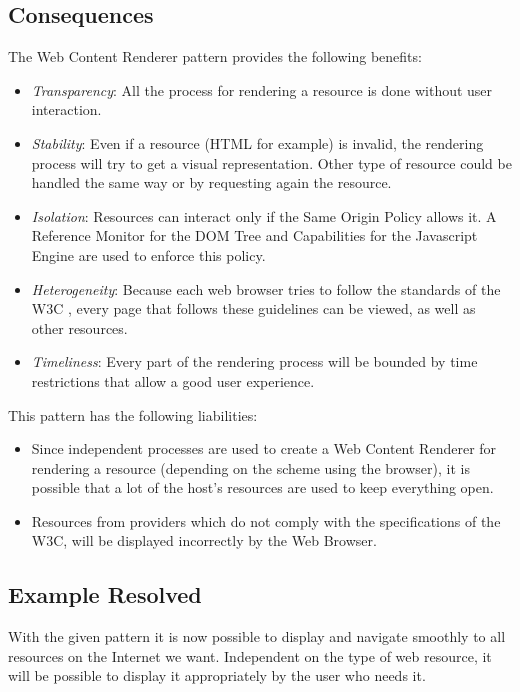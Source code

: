 \documentclass{sig-alternate-05-2015}
\begin{document}
  \subsection*{Consequences}
  The Web Content Renderer pattern provides the following benefits:
  \begin{itemize}
    \item \textit{Transparency}: All the process for rendering a resource is done without user interaction.
    \item \textit{Stability}: Even if a resource (HTML for example) is invalid, the rendering process will try to get a visual representation. Other type of resource could be handled the same way or by requesting again the resource.
    \item \textit{Isolation}: Resources can interact only if the Same Origin Policy allows it. A Reference Monitor for the DOM Tree and Capabilities for the Javascript Engine are used to enforce this policy.
    \item \textit{Heterogeneity}: Because each web browser tries to follow the standards of the W3C \cite{w3c}, every page that follows these guidelines can be viewed, as well as other resources.
    \item \textit{Timeliness}: Every part of the rendering process will be bounded by time restrictions that allow a good user experience.
  \end{itemize}
  This pattern has the following liabilities:
  \begin{itemize}
    \item Since independent processes are used to create a Web Content Renderer for rendering a resource (depending on the scheme using the browser), it is possible that a lot of the host's resources are used to keep everything open.
    \item Resources from providers which do not comply with the specifications of the W3C, will be displayed incorrectly by the Web Browser.
  \end{itemize}

  \subsection*{Example Resolved}
With the given pattern it is now possible to display and navigate smoothly to all resources on the Internet we want. Independent on the type of web resource, it will be possible to display it appropriately by the user who needs it. 
\end{document}
